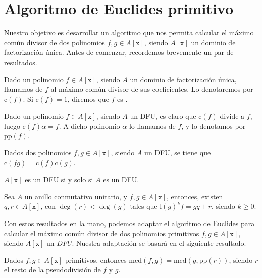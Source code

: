\documentclass[a4paper, 11pt, twoside, notitlepage, openany, onecolumn, final]{report}
\begin{document}
\section{Algoritmo de Euclides primitivo}
Nuestro objetivo es desarrollar un algoritmo que nos permita calcular el máximo común divisor de dos polinomios $f,g\in A[\texttt{x}]$, siendo $A[\texttt{x}]$ un dominio de factorización única. Antes de comenzar, recordemos brevemente un par de resultados.
\begin{defi}
	Dado un polinomio $f\in A[\texttt{x}]$, siendo $A$ un dominio de factorización única, llamamos  de $f$ al máximo común divisor de sus coeficientes. Lo denotaremos por $\text{c}(f)$. Si $\text{c}(f)=1$, diremos que $f$ es .
\end{defi}
\begin{defi}
	Dado un polinomio $f\in A[\texttt{x}]$, siendo $A$ un DFU, es claro que $\text{c}(f)$ divide a $f$, luego $\text{c}(f)\alpha = f$. A dicho polinomio $\alpha$ lo llamamos  de $f$, y lo denotamos por $\text{pp}(f)$.
\end{defi}
\begin{lem}
	Dados dos polinomios $f,g\in A[\texttt{x}]$, siendo $A$ un DFU, se tiene que $\mathrm{c}(fg)=\mathrm{c}(f)\mathrm{c}(g)$.
\end{lem}
\begin{lem}
	$A[\texttt{x}]$ es un DFU si y solo si $A$ es un DFU.
\end{lem}
\begin{lem}
	Sea $A$ un anillo conmutativo unitario, y $f,g\in A[\texttt{x}]$, entonces, existen $q,r\in A[\texttt{x}]$, con $\deg(r)<\deg(g)$ tales que $\mathrm{l}(g)^kf=gq+r$, siendo $k\geq0$.
\end{lem}
Con estos resultados en la mano, podemos adaptar el algoritmo de Euclides para calcular el máximo común divisor de dos polinomios primitivos $f,g\in A[\texttt{x}]$, siendo $A[\texttt{x}]$ un $DFU$. Nuestra adaptación se basará en el siguiente resultado.
\begin{prop}
	Dados $f,g\in A[\texttt{x}]$ primitivos, entonces $\mathrm{mcd}(f,g)=\mathrm{mcd}(g,\mathrm{pp}(r))$, siendo $r$ el resto de la pseudodivisión de $f$ y $g$.
\end{prop}
\end{document}
